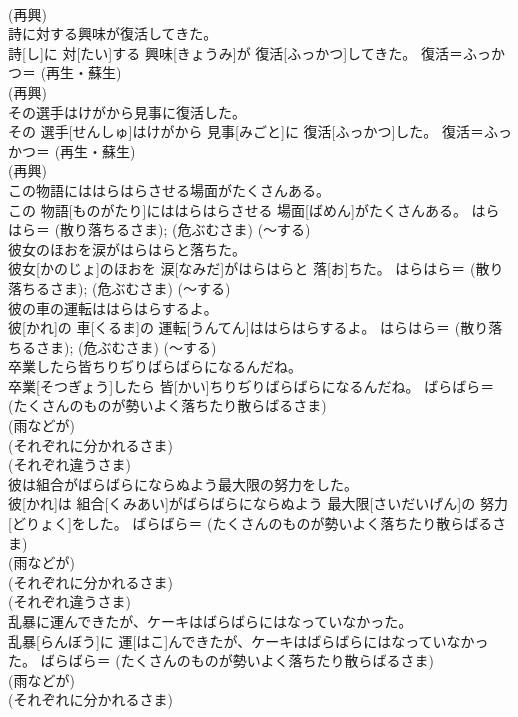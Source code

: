\documentclass[8pt]{extreport}
\begin{document}
\begin{CJK}{UTF8}{min}
{\\	(再興) 
\\	詩に対する興味が復活してきた。	
\\	詩[し]に 対[たい]する 興味[きょうみ]が 復活[ふっかつ]してきた。	復活＝ふっかつ＝ (再生・蘇生) 
\\	(再興) 
\\	その選手はけがから見事に復活した。	
\\	その 選手[せんしゅ]はけがから 見事[みごと]に 復活[ふっかつ]した。	復活＝ふっかつ＝ (再生・蘇生) 
\\	(再興) 
\\	この物語にははらはらさせる場面がたくさんある。	
\\	この 物語[ものがたり]にははらはらさせる 場面[ばめん]がたくさんある。	はらはら＝ (散り落ちるさま); (危ぶむさま) (〜する) 
\\	彼女のほおを涙がはらはらと落ちた。	
\\	彼女[かのじょ]のほおを 涙[なみだ]がはらはらと 落[お]ちた。	はらはら＝ (散り落ちるさま); (危ぶむさま) (〜する) 
\\	彼の車の運転ははらはらするよ。	
\\	彼[かれ]の 車[くるま]の 運転[うんてん]ははらはらするよ。	はらはら＝ (散り落ちるさま); (危ぶむさま) (〜する) 
\\	卒業したら皆ちりぢりばらばらになるんだね。	
\\	卒業[そつぎょう]したら 皆[かい]ちりぢりばらばらになるんだね。	ばらばら＝ (たくさんのものが勢いよく落ちたり散らばるさま) 
\\	(雨などが) 
\\	(それぞれに分かれるさま) 
\\	(それぞれ違うさま) 
\\	彼は組合がばらばらにならぬよう最大限の努力をした。	
\\	彼[かれ]は 組合[くみあい]がばらばらにならぬよう 最大限[さいだいげん]の 努力[どりょく]をした。	ばらばら＝ (たくさんのものが勢いよく落ちたり散らばるさま) 
\\	(雨などが) 
\\	(それぞれに分かれるさま) 
\\	(それぞれ違うさま) 
\\	乱暴に運んできたが、ケーキはばらばらにはなっていなかった。	
\\	乱暴[らんぼう]に 運[はこ]んできたが、ケーキはばらばらにはなっていなかった。	ばらばら＝ (たくさんのものが勢いよく落ちたり散らばるさま) 
\\	(雨などが) 
\\	(それぞれに分かれるさま) 
}
\end{CJK}
\end{document}
